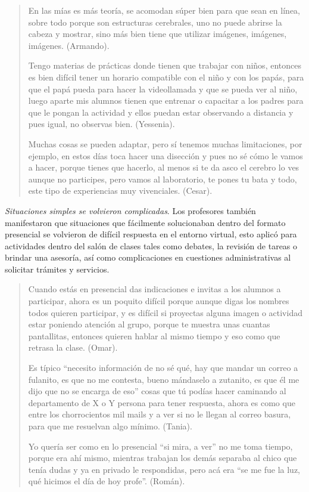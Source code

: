 \documentclass[spanish]{textolivre}
\begin{document}
\begin{quote}
    En las mías es más teoría, se acomodan súper bien para que sean en línea, sobre todo porque son estructuras cerebrales, uno no puede abrirse la cabeza y mostrar, sino más bien tiene que utilizar imágenes, imágenes, imágenes. (Armando).

    Tengo materias de prácticas donde tienen que trabajar con niños, entonces es bien difícil tener un horario compatible con el niño y con los papás, para que el papá pueda para hacer la videollamada y que se pueda ver al niño, luego aparte mis alumnos tienen que entrenar o capacitar a los padres para que le pongan la actividad y ellos puedan estar observando a distancia y pues igual, no observas bien. (Yessenia).

    Muchas cosas se pueden adaptar, pero sí tenemos muchas limitaciones, por ejemplo, en estos días toca hacer una disección y pues no sé cómo le vamos a hacer, porque tienes que hacerlo, al menos si te da asco el cerebro lo ves aunque no participes, pero vamos al laboratorio, te pones tu bata y todo, este tipo de experiencias muy vivenciales. (Cesar).
\end{quote}

\textit{Situaciones simples se volvieron complicadas}. Los profesores también manifestaron que situaciones que fácilmente solucionaban dentro del formato presencial se volvieron de difícil respuesta en el entorno virtual, esto aplicó para actividades dentro del salón de clases tales como debates, la revisión de tareas o brindar una asesoría, así como complicaciones en cuestiones administrativas al solicitar trámites y servicios. 

\begin{quote}
    Cuando estás en presencial das indicaciones e invitas a los alumnos a participar, ahora es un poquito difícil porque aunque digas los nombres todos quieren participar, y es difícil si proyectas alguna imagen o actividad estar poniendo atención al grupo, porque te muestra unas cuantas pantallitas, entonces quieren hablar al mismo tiempo y eso como que retrasa la clase. (Omar).

    Es típico “necesito información de no sé qué, hay que mandar un correo a fulanito, es que no me contesta, bueno mándaselo a zutanito, es que él me dijo que no se encarga de eso” cosas que tú podías hacer caminando al departamento de X o Y persona para tener respuesta, ahora es como que entre los chorrocientos mil mails y a ver si no le llegan al correo basura, para que me resuelvan algo mínimo. (Tania).

    Yo quería ser como en lo presencial “si mira, a ver” no me toma tiempo, porque era ahí mismo, mientras trabajan los demás separaba al chico que tenía dudas y ya en privado le respondidas, pero acá era “se me fue la luz, qué hicimos el día de hoy profe”. (Román).
\end{quote}
\end{document}
